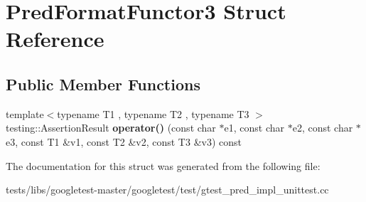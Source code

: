 \hypertarget{structPredFormatFunctor3}{}\section{Pred\+Format\+Functor3 Struct Reference}
\label{structPredFormatFunctor3}
\subsection*{Public Member Functions}
\begin{DoxyCompactItemize}
\item 
\mbox{\label{structPredFormatFunctor3_a35575b0ed1e572d3a31603b07a3f6b30}} 
{\footnotesize template$<$typename T1 , typename T2 , typename T3 $>$ }\\testing\+::\+Assertion\+Result {\bfseries operator()} (const char $\ast$e1, const char $\ast$e2, const char $\ast$e3, const T1 \&v1, const T2 \&v2, const T3 \&v3) const
\end{DoxyCompactItemize}


The documentation for this struct was generated from the following file\+:\begin{DoxyCompactItemize}
\item 
tests/libs/googletest-\/master/googletest/test/gtest\+\_\+pred\+\_\+impl\+\_\+unittest.\+cc\end{DoxyCompactItemize}
